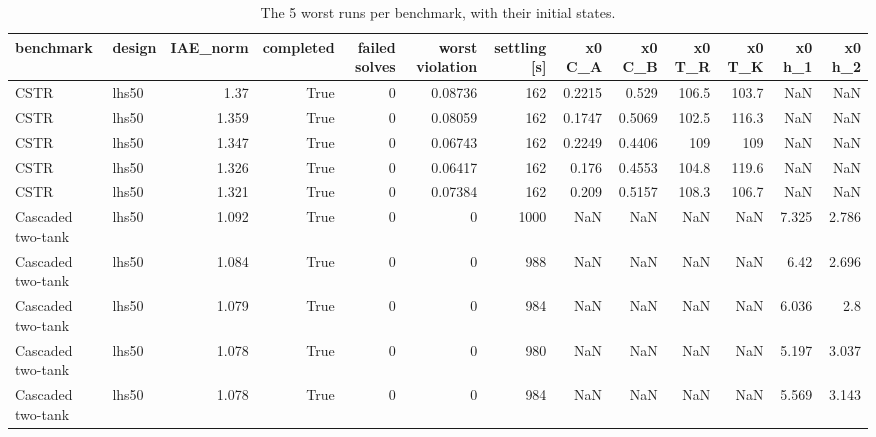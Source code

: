 \begin{table}
\caption{The 5 worst runs per benchmark, with their initial states.}
\label{tab:T2_worst_initial_conditions}
\begin{tabular}{llrrrrrrrrrrr}
\toprule
benchmark & design & IAE\_norm & completed & failed solves & worst violation & settling [s] & x0 C\_A & x0 C\_B & x0 T\_R & x0 T\_K & x0 h\_1 & x0 h\_2 \\
\midrule
CSTR & lhs50 & 1.37 & True & 0 & 0.08736 & 162 & 0.2215 & 0.529 & 106.5 & 103.7 & NaN & NaN \\
CSTR & lhs50 & 1.359 & True & 0 & 0.08059 & 162 & 0.1747 & 0.5069 & 102.5 & 116.3 & NaN & NaN \\
CSTR & lhs50 & 1.347 & True & 0 & 0.06743 & 162 & 0.2249 & 0.4406 & 109 & 109 & NaN & NaN \\
CSTR & lhs50 & 1.326 & True & 0 & 0.06417 & 162 & 0.176 & 0.4553 & 104.8 & 119.6 & NaN & NaN \\
CSTR & lhs50 & 1.321 & True & 0 & 0.07384 & 162 & 0.209 & 0.5157 & 108.3 & 106.7 & NaN & NaN \\
Cascaded two-tank & lhs50 & 1.092 & True & 0 & 0 & 1000 & NaN & NaN & NaN & NaN & 7.325 & 2.786 \\
Cascaded two-tank & lhs50 & 1.084 & True & 0 & 0 & 988 & NaN & NaN & NaN & NaN & 6.42 & 2.696 \\
Cascaded two-tank & lhs50 & 1.079 & True & 0 & 0 & 984 & NaN & NaN & NaN & NaN & 6.036 & 2.8 \\
Cascaded two-tank & lhs50 & 1.078 & True & 0 & 0 & 980 & NaN & NaN & NaN & NaN & 5.197 & 3.037 \\
Cascaded two-tank & lhs50 & 1.078 & True & 0 & 0 & 984 & NaN & NaN & NaN & NaN & 5.569 & 3.143 \\
\bottomrule
\end{tabular}
\end{table}
